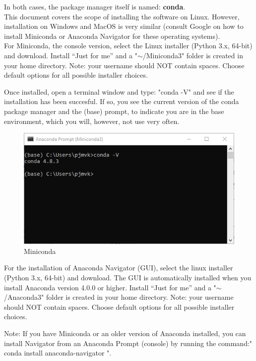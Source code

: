 \documentclass[a4paper,10pt]{article}
\begin{document}
In both cases, the package manager itself is named: \textbf{conda}.\\
This document covers the scope of installing the software on Linux. However, installation on Windows and MacOS is very similar (consult Google on how to install Miniconda or Anaconda Navigator for these operating systems).\\

For Miniconda, the console version, select the Linux installer (Python 3.x, 64-bit) and download. Install “Just for me” and a "$\sim$/Miniconda3" folder is created in your home directory.
Note: your username should NOT contain spaces.
Choose default options for all possible installer choices.

Once installed, open a terminal window and type: "conda -V" and see if the installation has been succesful. If so, you see the current version of the conda package manager and the (base) prompt, to indicate you are in the base environment, which you will, however, not use very often.\\

\begin{figure}[H]
	\centering
	\includegraphics[width=0.8\columnwidth]{Pictures/Miniconda_prompt.png}
	\caption[Short title]{Miniconda}
	\label{fig:Miniconda}\end{figure}

For the installation of Anaconda Navigator (GUI), select the linux installer (Python 3.x, 64-bit) and download. The GUI is automatically installed when you install Anaconda version 4.0.0 or higher. Install “Just for me” and a  "$\sim$/Anaconda3" folder is created in your home directory.
Note: your username should NOT contain spaces.
Choose default options for all possible installer choices.

Note: If you have Miniconda or an older version of Anaconda installed, you can install Navigator from an Anaconda Prompt (console) by running the command:" conda install anaconda-navigator ".\\
\end{document}
